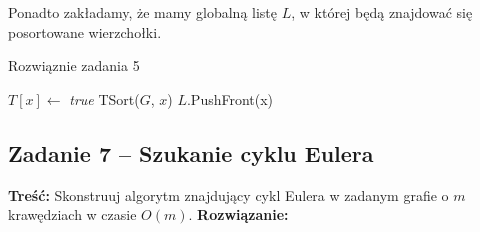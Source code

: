 Ponadto zakładamy, że mamy globalną listę $L$, w której 
będą znajdować się posortowane wierzchołki.

\begin{algorithm}[H]
	\caption{Rozwiąznie zadania 5}
	\begin{algorithmic}[1]
		\State $T[x] \gets$ \textit{true}
		\State TSort($G$, $x$)
		\EndIf
		\EndWhile
		\State $L$.PushFront(x)
		\EndProcedure
	\end{algorithmic}
	\label{Zadanie26}
\end{algorithm}

\subsection{Zadanie 7 -- Szukanie cyklu Eulera}
\textbf{Treść: } Skonstruuj algorytm znajdujący cykl Eulera 
w zadanym grafie o $m$ krawędziach w czasie $O(m)$.
\textbf{Rozwiązanie: }
